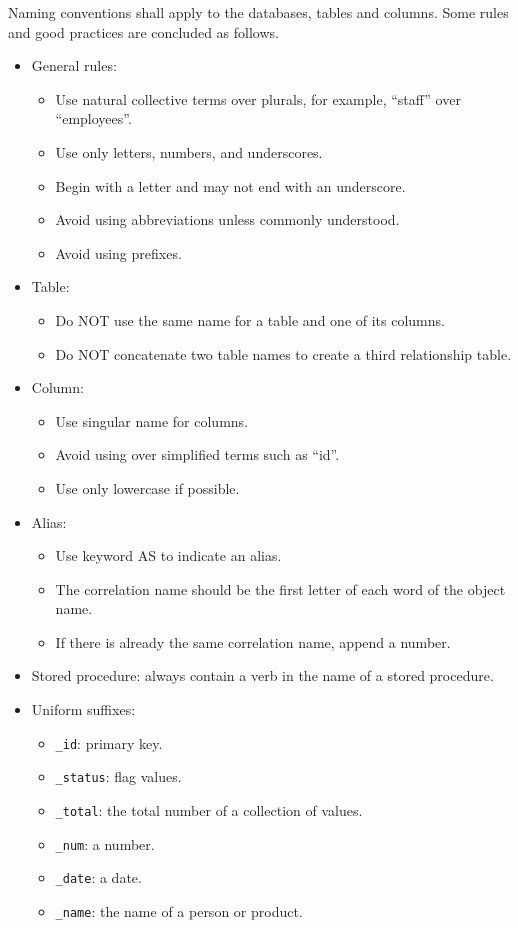 Naming conventions shall apply to the databases, tables and columns. Some rules and good practices are concluded as follows.
\begin{itemize}
\item General rules:
\begin{itemize}
\item Use natural collective terms over plurals, for example, ``staff'' over ``employees''.
\item Use only letters, numbers, and underscores.
\item Begin with a letter and may not end with an underscore.
\item Avoid using abbreviations unless commonly understood.
\item Avoid using prefixes.
\end{itemize}
\item Table:
\begin{itemize}
	\item Do NOT use the same name for a table and one of its columns.
	\item Do NOT concatenate two table names to create a third relationship table.
\end{itemize}
\item Column:
\begin{itemize}
	\item Use singular name for columns.
	\item Avoid using over simplified terms such as ``id''.
	\item Use only lowercase if possible.
\end{itemize}
\item Alias:
\begin{itemize}
	\item Use keyword AS to indicate an alias.
	\item The correlation name should be the first letter of each word of the object name.
	\item If there is already the same correlation name, append a number.
\end{itemize}
\item Stored procedure: always contain a verb in the name of a stored procedure.
\item Uniform suffixes:
\begin{itemize}
	\item \verb|_id|: primary key.
	\item \verb|_status|: flag values.
	\item \verb|_total|: the total number of a collection of values.
	\item \verb|_num|: a number.
	\item \verb|_date|: a date.
	\item \verb|_name|: the name of a person or product.
\end{itemize}
\end{itemize}

